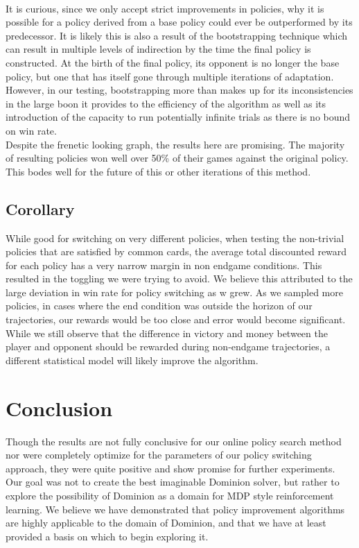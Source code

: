 \documentclass{article}
\begin{document}
  \\
  It is curious, since we only accept strict improvements in policies, why it is possible for a policy derived from a base policy could ever be outperformed by its predecessor. It is likely this is also a result of the bootstrapping technique which can result in multiple levels of indirection by the time the final policy is constructed. At the birth of the final policy, its opponent is no longer the base policy, but one that has itself gone through multiple iterations of adaptation. However, in our testing, bootstrapping more than makes up for its inconsistencies in the large boon it provides to the efficiency of the algorithm as well as its introduction of the capacity to run potentially infinite trials as there is no bound on win rate.
  \\
  Despite the frenetic looking graph, the results here are promising. The majority of resulting policies won well over 50\% of their games against the original policy. This bodes well for the future of this or other iterations of this method.
\\
  \subsection{Corollary}
While good for switching on very different policies, when testing the non-trivial policies that are satisfied by common cards, the average total discounted reward for each policy has a very narrow margin in non endgame conditions. This resulted in the toggling we were trying to avoid. We believe this attributed to the large deviation in win rate for policy switching as w grew. As we sampled more policies, in cases where the end condition was outside the horizon of our trajectories, our rewards would be too close and error would become significant. While we still observe that the difference in victory and money between the player and opponent should be rewarded during non-endgame trajectories, a different statistical model will likely improve the algorithm.
\section{Conclusion}
Though the results are not fully conclusive for our online policy search method nor were completely optimize for the parameters of our policy switching approach, they were quite positive and show promise for further experiments. Our goal was not to create the best imaginable Dominion solver, but rather to explore the possibility of Dominion as a domain for MDP style reinforcement learning. We believe we have demonstrated that policy improvement algorithms are highly applicable to the domain of Dominion, and that we have at least provided a basis on which to begin exploring it.
\end{document}
